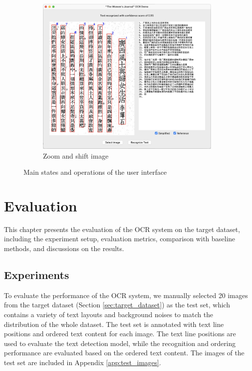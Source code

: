 \documentclass[12pt,twoside]{report}
\begin{document}
\begin{figure}[htbp]
\begin{subfigure}[b]{0.3\linewidth}
    \end{subfigure}
    \hfill
    \begin{subfigure}[b]{0.3\linewidth}
        \includegraphics[width=\linewidth]{./figures/ui1.6.jpeg}
        \caption{Zoom and shift image}
        \label{fig:ui1.6}
    \end{subfigure}
    \caption{Main states and operations of the user interface}
    \label{fig:ui1}
\end{figure}

\chapter{Evaluation}
This chapter presents the evaluation of the OCR system on the target dataset, including the experiment setup, evaluation metrics, comparison with baseline methods, and discussions on the results.

\section{Experiments}
\label{sec:experiments}
To evaluate the performance of the OCR system, we manually selected 20 images from the target dataset (Section \ref{sec:target_dataset}) as the test set, which contains a variety of text layouts and background noises to match the distribution of the whole dataset. The test set is annotated with text line positions and ordered text content for each image. The text line positions are used to evaluate the text detection model, while the recognition and ordering performance are evaluated based on the ordered text content. The images of the test set are included in Appendix \ref{app:test_images}.
\end{document}
